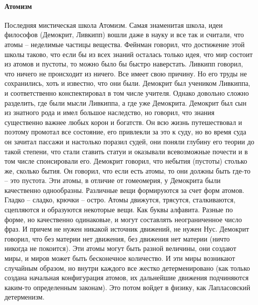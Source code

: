 \documentclass[a4paper, 12pt]{article}
\begin{document}
\paragraph{Атомизм}
Последняя мистическая школа Атомизм. Самая знаменитая школа, идеи философов (Демокрит, Ливкипп) вошли даже в науку и все так и считали, что атомы -- неделимые частицы вещества. Фейнман говорил, что достижение этой школы таково, что если бы из всех знаний осталась только идея, что мир состоит из атомов и пустоты, то можно было бы быстро наверстать. Ливкипп говорил, что ничего не происходит из ничего. Все имеет свою причину. Но его труды не сохранились, хоть и известно, что они были. Демокрит был учеником Ливкиппа, и соответственно конспектировал в том числе учителя. Однако довольно сложно разделить, где были мысли Ливкиппа, а где уже Демокрита. Демокрит был сын из знатного рода и имел большое наследство, но говорил, что знания существенно важнее любых корон и богатств. Он всю жизнь путешествовал и поэтому промотал все состояние, его привлекли за это к суду, но во время суда он зачитал пассажи и настолько поразил судей, они поняли глубину его теории до такой степени, что стали ставить статуи и оказывали всевозможные почести и в том числе спонсировали его. Демокрит говорил, что небытия (пустоты) столько же, сколько бытия. Он говорил, что если есть атомы, то они должны быть где-то -- это пустота. Эти атомы, в отличие от гомеомерия, у Демокрита были качественно однообразны. Различные вещи формируются за счет форм атомов. Гладко -- сладко, крючки -- остро. Атомы движутся, трясутся, сталкиваются, сцепляются и образуются некоторые вещи. Как буквы алфавита. Разные по форме, но качественно одинаковые, и могут составлять неограниченное число фраз. И причем не нужен никакой источник движений, не нужен Нус. Демокрит говорил, что без материи нет движения, без движения нет материи (ничто никогда не покоится). Эти атомы могут быть разной величины, они создают миры, и миров может быть бесконечное количество. И эти миры возникают случайным образом, но внутри каждого все жестко детерменировано (как только создана начальная конфигурация атомов, их дальнейшие движения подчиняются каким-то определенным законам). Это потом войдет в физику, как Лапласовский детерменизм. 
\end{document}
